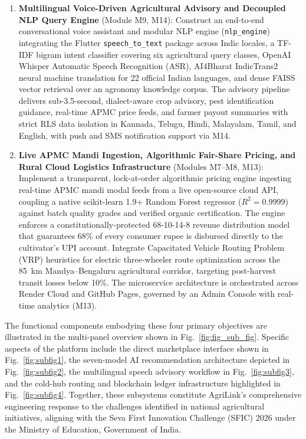 \begin{enumerate}[label=\textbf{Objective \arabic*:}, leftmargin=2.5cm]
	\item \textbf{Multilingual Voice-Driven Agricultural Advisory and Decoupled NLP Query Engine} (Module M9, M14): Construct an end-to-end conversational voice assistant and modular NLP engine (\texttt{nlp\_engine}) integrating the Flutter \texttt{speech\_to\_text} package across Indic locales, a TF-IDF bigram intent classifier covering six agricultural query classes, OpenAI Whisper Automatic Speech Recognition (ASR), AI4Bharat IndicTrans2 neural machine translation for 22 official Indian languages, and dense FAISS vector retrieval over an agronomy knowledge corpus. The advisory pipeline delivers sub-3.5-second, dialect-aware crop advisory, pest identification guidance, real-time APMC price feeds, and farmer payout summaries with strict RLS data isolation in Kannada, Telugu, Hindi, Malayalam, Tamil, and English, with push and SMS notification support via M14.

	\item \textbf{Live APMC Mandi Ingestion, Algorithmic Fair-Share Pricing, and Rural Cloud Logistics Infrastructure} (Modules M7--M8, M13): Implement a transparent, lock-at-order algorithmic pricing engine ingesting real-time APMC mandi modal feeds from a live open-source cloud API, coupling a native scikit-learn 1.9+ Random Forest regressor ($R^2 = 0.9999$) against batch quality grades and verified organic certification. The engine enforces a constitutionally-protected 68-10-14-8 revenue distribution model that guarantees 68\% of every consumer rupee is disbursed directly to the cultivator's UPI account. Integrate Capacitated Vehicle Routing Problem (VRP) heuristics for electric three-wheeler route optimization across the 85~km Mandya--Bengaluru agricultural corridor, targeting post-harvest transit losses below 10\%. The microservice architecture is orchestrated across Render Cloud and GitHub Pages, governed by an Admin Console with real-time analytics (M13).
\end{enumerate}

The functional components embodying these four primary objectives are illustrated in the multi-panel overview shown in Fig.~\ref{fig:fig_sub_fig}. Specific aspects of the platform include the direct marketplace interface shown in Fig.~\ref{fig:subfig1}, the seven-model AI recommendation architecture depicted in Fig.~\ref{fig:subfig2}, the multilingual speech advisory workflow in Fig.~\ref{fig:subfig3}, and the cold-hub routing and blockchain ledger infrastructure highlighted in Fig.~\ref{fig:subfig4}. Together, these subsystems constitute AgriLink's comprehensive engineering response to the challenges identified in national agricultural initiatives, aligning with the Seva First Innovation Challenge (SFIC) 2026 under the Ministry of Education, Government of India.

